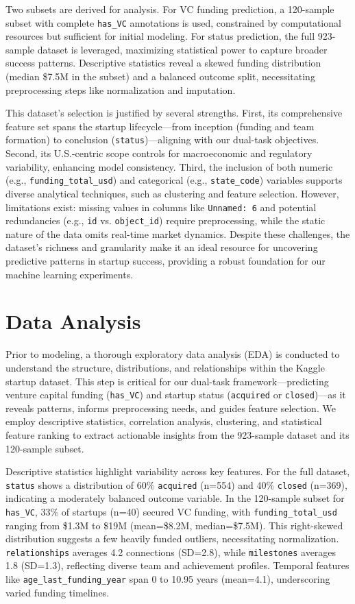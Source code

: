 \documentclass[conference]{IEEEtran}
\begin{document}
    Two subsets are derived for analysis. For VC funding prediction, a 120-sample subset with complete \texttt{has\_VC} annotations is used, constrained by computational resources but sufficient for initial modeling. For status prediction, the full 923-sample dataset is leveraged, maximizing statistical power to capture broader success patterns. Descriptive statistics reveal a skewed funding distribution (median \$7.5M in the subset) and a balanced outcome split, necessitating preprocessing steps like normalization and imputation.

    This dataset’s selection is justified by several strengths. First, its comprehensive feature set spans the startup lifecycle—from inception (funding and team formation) to conclusion (\texttt{status})—aligning with our dual-task objectives. Second, its U.S.-centric scope controls for macroeconomic and regulatory variability, enhancing model consistency. Third, the inclusion of both numeric (e.g., \texttt{funding\_total\_usd}) and categorical (e.g., \texttt{state\_code}) variables supports diverse analytical techniques, such as clustering and feature selection. However, limitations exist: missing values in columns like \texttt{Unnamed: 6} and potential redundancies (e.g., \texttt{id} vs. \texttt{object\_id}) require preprocessing, while the static nature of the data omits real-time market dynamics. Despite these challenges, the dataset’s richness and granularity make it an ideal resource for uncovering predictive patterns in startup success, providing a robust foundation for our machine learning experiments.


\section{Data Analysis}
    Prior to modeling, a thorough exploratory data analysis (EDA) is conducted to understand the structure, distributions, and relationships within the Kaggle startup dataset. This step is critical for our dual-task framework—predicting venture capital funding (\texttt{has\_VC}) and startup status (\texttt{acquired} or \texttt{closed})—as it reveals patterns, informs preprocessing needs, and guides feature selection. We employ descriptive statistics, correlation analysis, clustering, and statistical feature ranking to extract actionable insights from the 923-sample dataset and its 120-sample subset.

    Descriptive statistics highlight variability across key features. For the full dataset, \texttt{status} shows a distribution of 60\% \texttt{acquired} (n=554) and 40\% \texttt{closed} (n=369), indicating a moderately balanced outcome variable. In the 120-sample subset for \texttt{has\_VC}, 33\% of startups (n=40) secured VC funding, with \texttt{funding\_total\_usd} ranging from \$1.3M to \$19M (mean=\$8.2M, median=\$7.5M). This right-skewed distribution suggests a few heavily funded outliers, necessitating normalization. \texttt{relationships} averages 4.2 connections (SD=2.8), while \texttt{milestones} averages 1.8 (SD=1.3), reflecting diverse team and achievement profiles. Temporal features like \texttt{age\_last\_funding\_year} span 0 to 10.95 years (mean=4.1), underscoring varied funding timelines.
\end{document}
